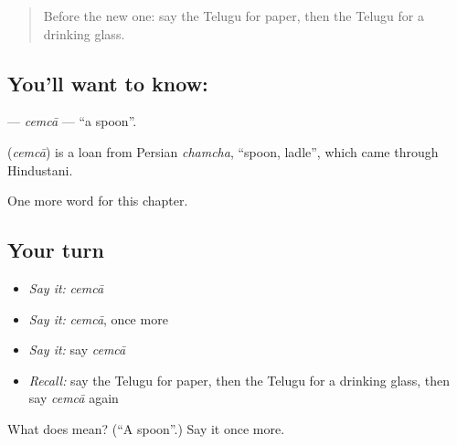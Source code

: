 \label{lesson:TE-C112-cemca}



\begin{quote}
Before the new one: say the Telugu for paper, then the Telugu for a drinking glass.
\end{quote}

\subsection*{You'll want to know: }
\textbf{} — \emph{cemcā} — \textquotedblleft{}a spoon\textquotedblright{}.

\begin{cousinweb}
\textbf{} (\emph{cemcā}) is a loan from Persian \emph{chamcha}, \textquotedblleft{}spoon, ladle\textquotedblright{}, which came through Hindustani.
\end{cousinweb}

\begin{grammarlens}[title={What you've built}]
One more word for this chapter.
\end{grammarlens}

\subsection*{Your turn}
\begin{itemize}
\raggedright
  \item \emph{Say it:} \emph{cemcā}
  \item \emph{Say it:} \emph{cemcā}, once more
  \item \emph{Say it:} say \emph{cemcā}
  \item \emph{Recall:} say the Telugu for paper, then the Telugu for a drinking glass, then say \emph{cemcā} again
\end{itemize}

\begin{tcolorbox}[breakable,colback=teal!4,colframe=teal!35!black,title={Before you move on}]
What does  mean? (\textquotedblleft{}A spoon\textquotedblright{}.) Say it once more.
\end{tcolorbox}
